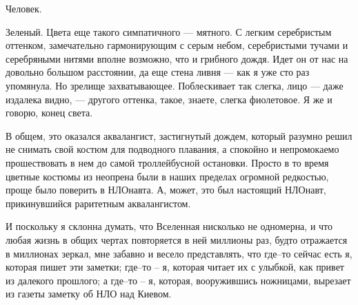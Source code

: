Человек.

Зеленый. Цвета еще такого симпатичного — мятного. С легким серебристым
оттенком, замечательно гармонирующим с серым небом, серебристыми тучами и
серебряными нитями вполне возможно, что и грибного дождя. Идет он от нас на
довольно большом расстоянии, да еще стена ливня — как я уже сто раз упомянула.
Но зрелище захватывающее. Поблескивает так слегка, лицо — даже издалека видно,
— другого оттенка, такое, знаете, слегка фиолетовое. Я же и говорю, конец
света.

В общем, это оказался аквалангист, застигнутый дождем, который разумно решил не
снимать свой костюм для подводного плавания, а спокойно и непромокаемо
прошествовать в нем до самой троллейбусной остановки. Просто в то время цветные
костюмы из неопрена были в наших пределах огромной редкостью, проще было
поверить в НЛОнавта. А, может, это был настоящий НЛОнавт, прикинувшийся
раритетным аквалангистом. 

И поскольку я склонна думать, что Вселенная нисколько не одномерна, и что любая
жизнь в общих чертах повторяется в ней миллионы раз, будто отражается в
миллионах зеркал, мне забавно и весело представлять, что где–то сейчас есть я,
которая пишет эти заметки; где–то – я, которая читает их с улыбкой, как привет
из далекого прошлого; а где–то – я, которая, вооружившись ножницами, вырезает
из газеты заметку об НЛО над Киевом.

